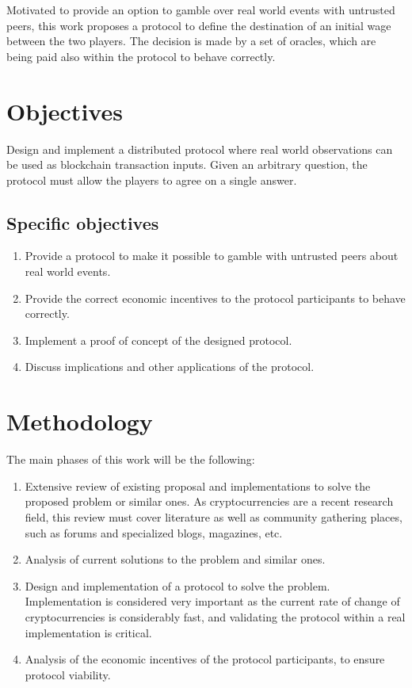 Motivated to provide an option to gamble over real world events with untrusted
 peers,
this work proposes a protocol to define the destination of an initial wage
  between the two players.
The decision is made by a set of oracles, which are being paid also within the
  protocol to behave correctly.

\section{Objectives}
Design and implement a distributed protocol where real world observations can
  be used as blockchain transaction inputs.
Given an arbitrary question, the protocol must allow the players to agree
  on a single answer.

\subsection{Specific objectives}
\begin{enumerate}
	\item Provide a protocol to make it possible to gamble with untrusted peers
	  about real world events.
	\item Provide the correct economic incentives to the protocol participants to
	  behave correctly.
	\item Implement a proof of concept of the designed protocol.
	\item Discuss implications and other applications of the protocol.
\end{enumerate}

\section{Methodology}
The main phases of this work will be the following:
\begin{enumerate}
	\item Extensive review of existing proposal and implementations to solve
	  the proposed pro\-blem or similar ones. As cryptocurrencies are a recent
	  research field, this review must cover literature as well as
	  community gathering places, such as forums and specialized blogs,
	  magazines, etc.
  \item Analysis of current solutions to the problem and similar ones.
  \item Design and implementation of a protocol to solve the problem.
    Implementation is considered very important as the current rate of change
    of cryptocurrencies is considerably fast, and validating the protocol within
    a real implementation is critical.
  \item Analysis of the economic incentives of the protocol participants, to
    ensure protocol viability.
\end{enumerate}

